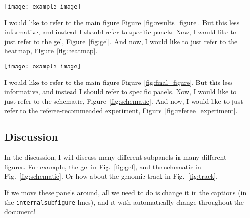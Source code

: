 \documentclass[onecolumn,11pt]{article}
\begin{document}
\clearpage

\begin{busyfigure}[ht]
        \centering
        \texttt{[image: example-image]} 
\end{busyfigure}

I would like to refer to the main figure Figure~\ref{fig:results_figure}.
But this less informative, and instead I should refer to specific panels.
Now, I would like to just refer to the gel, Figure~\ref{fig:gel}.
And now, I would like to just refer to the heatmap, Figure~\ref{fig:heatmap}.


\begin{busyfigure}[ht]
        \centering
        \texttt{[image: example-image]} 
\end{busyfigure}

I would like to refer to the main figure Figure~\ref{fig:final_figure}. But this less informative, and instead I should refer to specific panels.
Now, I would like to just refer to the schematic, Figure~\ref{fig:schematic}.
And now, I would like to just refer to the referee-recommended experiment, Figure~\ref{fig:referee_experiment}.

\subsection*{Discussion}

In the discussion, I will discuss many different subpanels in many different figures.
For example, the gel in Fig.~\ref{fig:gel}, and the schematic in Fig.~\ref{fig:schematic}.
Or how about the genomic track in Fig.~\ref{fig:track}.

If we move these panels around, all we need to do is change it in the captions (in the \verb|internalsubfigure| lines), and it with automatically change throughout the document! 
\end{document}
